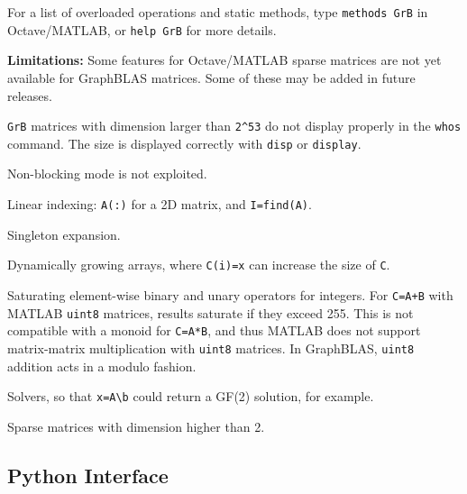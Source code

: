 \documentclass[12pt]{article}
\newenvironment{packed_itemize}{
\begin{itemize}
  \setlength{\itemsep}{1pt}
  \setlength{\parskip}{0pt}
  \setlength{\parsep}{0pt}
}{\end{itemize}}
\begin{document}
For a list of overloaded operations and static methods, type
\verb'methods GrB' in Octave/MATLAB, or \verb'help GrB' for more details.

{\bf Limitations:}
Some features for Octave/MATLAB sparse matrices are not yet available for
GraphBLAS matrices.  Some of these may be added in future releases.

\begin{packed_itemize}
    \item \verb'GrB' matrices with dimension larger than \verb'2^53' do not
        display properly in the \verb'whos' command.  The size is displayed
        correctly with \verb'disp' or \verb'display'.
    \item Non-blocking mode is not exploited.
    \item Linear indexing: \verb'A(:)' for a 2D matrix, and \verb'I=find(A)'.
    \item Singleton expansion.
    \item Dynamically growing arrays, where \verb'C(i)=x' can increase
        the size of \verb'C'.
    \item Saturating element-wise binary and unary operators for integers.
        For \verb'C=A+B' with MATLAB \verb'uint8' matrices, results
        saturate if they exceed 255.  This is not compatible with
        a monoid for \verb'C=A*B', and thus MATLAB does not support
        matrix-matrix multiplication with \verb'uint8' matrices.
        In GraphBLAS, \verb'uint8' addition acts in a modulo fashion.
    \item Solvers, so that \verb'x=A\b' could return a GF(2) solution,
        for example.
    \item Sparse matrices with dimension higher than 2.
\end{packed_itemize}

\subsection{Python Interface}
\label{python}
\end{document}
